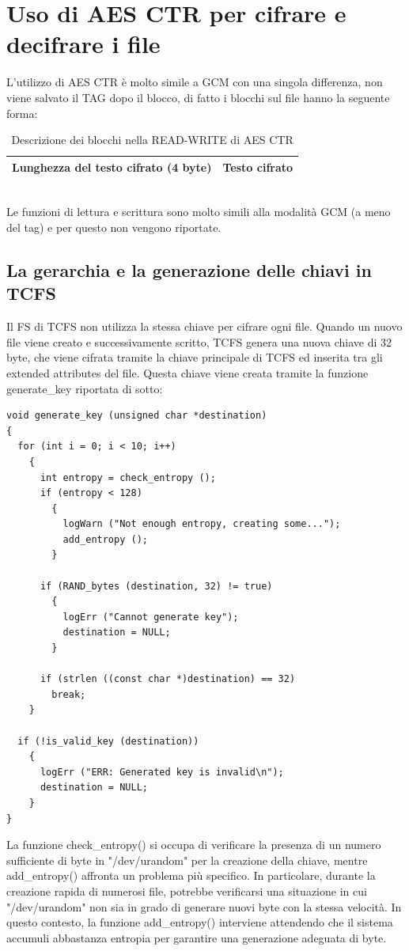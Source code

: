 \section{Uso di AES CTR per cifrare e decifrare i file}
L'utilizzo di AES CTR è molto simile a GCM con una singola differenza, non viene salvato il TAG dopo il blocco, di fatto i blocchi sul file hanno la seguente forma:\\
\begin{table}[htbp]
        \centering
        \begin{tabular}{|l|l|}
            \hline
            Lunghezza del testo cifrato (4 byte) & Testo cifrato \\
            \hline
        \end{tabular}
        \caption{Descrizione dei blocchi nella READ-WRITE di AES CTR}
    \label{tab:tabella-blocchi-read-write-ctr}
\end{table} \\
Le funzioni di lettura e scrittura sono molto simili alla modalità GCM (a meno del tag) e per questo non vengono riportate.

\subsection{La gerarchia e la generazione delle chiavi in TCFS}
Il FS di TCFS non utilizza la stessa chiave per cifrare ogni file. Quando un nuovo file viene creato e successivamente scritto, TCFS genera una nuova chiave di 32 byte, che viene cifrata tramite la chiave principale di TCFS ed inserita tra gli extended attributes del file. Questa chiave viene creata tramite la funzione generate\_key riportata di sotto:
\begin{lstlisting}[style=C, caption=Esempio di generate\_key, label=C-gen-key-expl]
void generate_key (unsigned char *destination)
{
  for (int i = 0; i < 10; i++)
    {
      int entropy = check_entropy ();
      if (entropy < 128)
        {
          logWarn ("Not enough entropy, creating some...");
          add_entropy ();
        }

      if (RAND_bytes (destination, 32) != true)
        {
          logErr ("Cannot generate key");
          destination = NULL;
        }

      if (strlen ((const char *)destination) == 32)
        break;
    }

  if (!is_valid_key (destination))
    {
      logErr ("ERR: Generated key is invalid\n");
      destination = NULL;
    }
}
\end{lstlisting}
La funzione check\_entropy() si occupa di verificare la presenza di un numero sufficiente di byte in "/dev/urandom" per la creazione della chiave, mentre add\_entropy() affronta un problema più specifico. In particolare, durante la creazione rapida di numerosi file, potrebbe verificarsi una situazione in cui "/dev/urandom" non sia in grado di generare nuovi byte con la stessa velocità. In questo contesto, la funzione add\_entropy() interviene attendendo che il sistema accumuli abbastanza entropia per garantire una generazione adeguata di byte.

